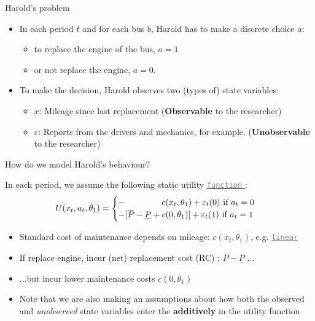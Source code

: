 \documentclass[aspectratio=169]{beamer}
\begin{document}
	\begin{frame}{Harold's problem}
		\begin{itemize}
			\itemsep1em
			\item In each period $t$ and for each bus $b$, Harold has to make a discrete choice $a$:
			\begin{itemize}
				\itemsep1em
				\item to replace the engine of the bus, $a=1$
				\item or not replace the engine, $a=0$.
			\end{itemize}
			\item To make the decision, Harold observes two (types of) state variables:
			\vspace{1em}
			\begin{itemize}
				\itemsep1em
				\item  $x$: Mileage since last replacement (\textbf{Observable} to the researcher)
				\item $\varepsilon$: Reports from the drivers and mechanics, for example. (\textbf{Unobservable} to the researcher)
			\end{itemize}
			
		\end{itemize}
	\end{frame}
	
	
	\begin{frame}{How do we model Harold's behaviour?}\label{utilities}
		
		In each period, we assume the following static utility  \hyperlink{cost.m}{
			\textcolor{gray}{
				\texttt{function}
			}
		}:
		\begin{equation}
			U(x_t,a_t,\theta_1) = \begin{cases}
				- \hspace{1.5cm} c(x_t,\theta_1) + \varepsilon_t(0)  \text{ if } a_t = 0 \\
				-[\overline{P} - \underline{P}+c(0,\theta_1)] + \varepsilon_t(1) \text{ if } a_t = 1
			\end{cases}
		\end{equation}
		
		\begin{itemize}
			\itemsep1em
			\item Standard cost of maintenance depends on mileage: $c(x_t,\theta_1)$, e.g. \hyperlink{c.m}{\textcolor{gray}{\texttt{linear}}}
			\item If replace engine, incur (net) replacement cost (RC) :  $\overline{P}-\underline{P}$ ...
			\item ...but incur lower maintenance costs $c(0,\theta_1)$
			\item Note that we are also making an assumptions about how both the observed and \textit{unobserved} state variables enter the \textbf{additively} in the utility function
		\end{itemize}
		
	\end{frame}
	
\end{document}
